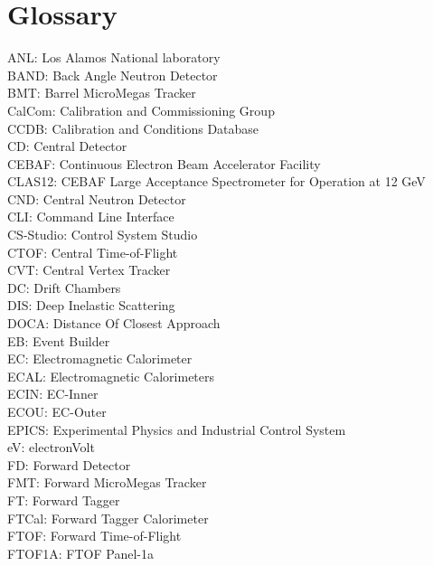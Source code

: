 \section*{Glossary}
{\setlength{\parskip}{0cm}
    ANL:       Los Alamos National laboratory \\
    BAND:      Back Angle Neutron Detector \\
    BMT:       Barrel MicroMegas Tracker \\
    CalCom:    Calibration and Commissioning Group \\
    CCDB:      Calibration and Conditions Database \\
    CD:        Central Detector \\
    CEBAF:     Continuous Electron Beam Accelerator Facility \\
    CLAS12:    CEBAF Large Acceptance Spectrometer for Operation at 12 GeV \\
    CND:       Central Neutron Detector \\
    CLI:       Command Line Interface \\
    CS-Studio: Control System Studio \\
    CTOF:      Central Time-of-Flight \\
    CVT:       Central Vertex Tracker \\
    DC:        Drift Chambers \\
    DIS:       Deep Inelastic Scattering \\
    DOCA:      Distance Of Closest Approach \\
    EB:        Event Builder \\
    EC:        Electromagnetic Calorimeter \\
    ECAL:      Electromagnetic Calorimeters \\
    ECIN:      EC-Inner \\
    ECOU:      EC-Outer \\
    EPICS:     Experimental Physics and Industrial Control System \\
    eV:        electronVolt \\
    FD:        Forward Detector \\
    FMT:       Forward MicroMegas Tracker \\
    FT:        Forward Tagger \\
    FTCal:     Forward Tagger Calorimeter \\
    FTOF:      Forward Time-of-Flight \\
    FTOF1A:    FTOF Panel-1a \\
}
